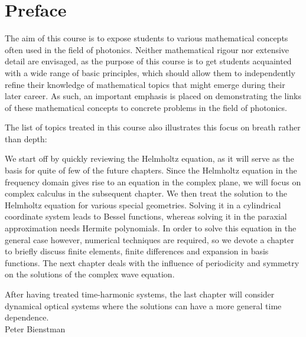 \chapter{Preface}
\label{h:Preface}

The aim of this course is to expose students to various mathematical concepts often used in the field of photonics. Neither mathematical rigour nor extensive detail are envisaged, as the purpose of this course is to get students acquainted with a wide range of basic principles, which should allow them to independently refine their knowledge of mathematical topics that might emerge during their later career. As such, an important emphasis is placed on demonstrating the links of these mathematical concepts to concrete problems in the field of photonics.

The list of topics treated in this course also illustrates this focus on breath rather than depth:

We start off by quickly reviewing the Helmholtz equation, as it will serve as the basis for quite of few of the future chapters. Since the Helmholtz equation in the frequency domain gives rise to an equation in the complex plane, we will focus on complex calculus in the subsequent chapter. We then treat the solution to the Helmholtz equation for various special geometries. Solving it in a cylindrical coordinate system leads to Bessel functions, whereas solving it in the paraxial approximation needs Hermite polynomials. In order to solve this equation in the general case however, numerical techniques are required, so we devote a chapter to briefly discuss finite elements, finite differences and expansion in basis functions. The next chapter deals with the influence of periodicity and symmetry on the solutions of the complex wave equation.

After having treated time-harmonic systems, the last chapter will consider dynamical optical systems where the solutions can have a more general time dependence.\\[1cm]

\hspace{10cm} Peter Bienstman

